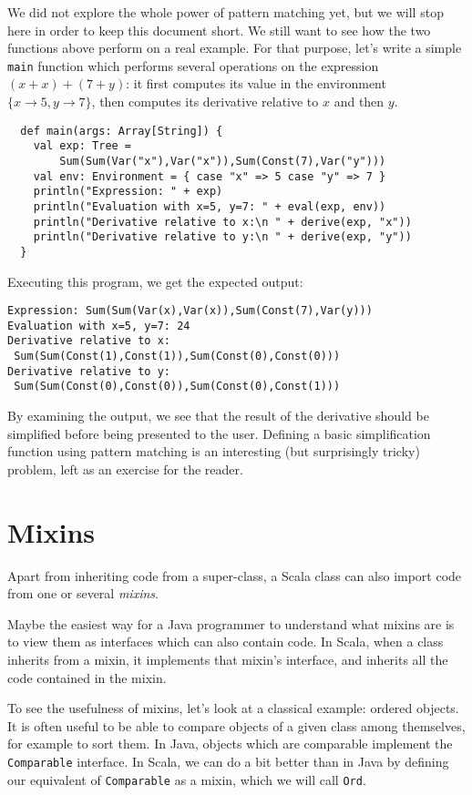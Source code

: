 \documentclass[a4paper,11pt,twoside,titlepage]{article}
\begin{document}
We did not explore the whole power of pattern matching yet, but we
will stop here in order to keep this document short. We still want to
see how the two functions above perform on a real example. For that
purpose, let's write a simple \lstinline?main? function which performs
several operations on the expression $(x+x)+(7+y)$: it first computes
its value in the environment $\{x\rightarrow 5, y\rightarrow 7\}$, then
computes its derivative relative to $x$ and then $y$.
\begin{lstlisting}
  def main(args: Array[String]) {
    val exp: Tree =
    	Sum(Sum(Var("x"),Var("x")),Sum(Const(7),Var("y")))
    val env: Environment = { case "x" => 5 case "y" => 7 }
    println("Expression: " + exp)
    println("Evaluation with x=5, y=7: " + eval(exp, env))
    println("Derivative relative to x:\n " + derive(exp, "x"))
    println("Derivative relative to y:\n " + derive(exp, "y"))
  }
\end{lstlisting}
Executing this program, we get the expected output:
\begin{verbatim}
Expression: Sum(Sum(Var(x),Var(x)),Sum(Const(7),Var(y)))
Evaluation with x=5, y=7: 24
Derivative relative to x:
 Sum(Sum(Const(1),Const(1)),Sum(Const(0),Const(0)))
Derivative relative to y:
 Sum(Sum(Const(0),Const(0)),Sum(Const(0),Const(1)))
\end{verbatim}
By examining the output, we see that the result of the derivative
should be simplified before being presented to the user. Defining a
basic simplification function using pattern matching is an interesting
(but surprisingly tricky) problem, left as an exercise for the reader.

\section*{Mixins}\label{sec:mixins}

Apart from inheriting code from a super-class, a Scala class can also
import code from one or several \emph{mixins}.

Maybe the easiest way for a Java programmer to understand what mixins
are is to view them as interfaces which can also contain code. In
Scala, when a class inherits from a mixin, it implements that mixin's
interface, and inherits all the code contained in the mixin.

To see the usefulness of mixins, let's look at a classical example:
ordered objects. It is often useful to be able to compare objects of a
given class among themselves, for example to sort them. In Java,
objects which are comparable implement the \lstinline?Comparable?
interface. In Scala, we can do a bit better than in Java by defining
our equivalent of \lstinline?Comparable? as a mixin, which we will call
\lstinline?Ord?.
\end{document}
